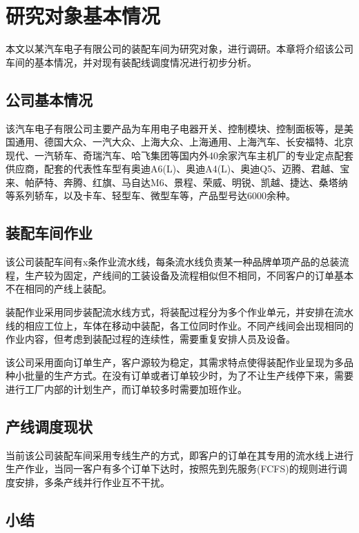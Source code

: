 \chapter{研究对象基本情况}
本文以某汽车电子有限公司的装配车间为研究对象，进行调研。本章将介绍该公司车间的基本情况，并对现有装配线调度情况进行初步分析。
\section{公司基本情况}
该汽车电子有限公司主要产品为车用电子电器开关、控制模块、控制面板等，是美国通用、德国大众、一汽大众、上海大众、上海通用、上海汽车、长安福特、北京现代、一汽轿车、奇瑞汽车、哈飞集团等国内外40余家汽车主机厂的专业定点配套供应商，配套的代表性车型有奥迪A6(L)、奥迪A4(L)、奥迪Q5、迈腾、君越、宝来、帕萨特、奔腾、红旗、马自达M6、景程、荣威、明锐、凯越、捷达、桑塔纳等系列轿车，以及卡车、轻型车、微型车等，产品型号达6000余种。

\section{装配车间作业}
该公司装配车间有x条作业流水线，每条流水线负责某一种品牌单项产品的总装流程，生产较为固定，产线间的工装设备及流程相似但不相同，不同客户的订单基本不在相同的产线上装配。

装配作业采用同步装配流水线方式，将装配过程分为多个作业单元，并安排在流水线的相应工位上，车体在移动中装配，各工位同时作业。不同产线间会出现相同的作业内容，但考虑到装配过程的连续性，需要重复安排人员及设备。

该公司采用面向订单生产，客户源较为稳定，其需求特点使得装配作业呈现为多品种小批量的生产方式。在没有订单或者订单较少时，为了不让生产线停下来，需要进行工厂内部的计划生产，而订单较多时需要加班作业。

\section{产线调度现状}
当前该公司装配车间采用专线生产的方式，即客户的订单在其专用的流水线上进行生产作业，当同一客户有多个订单下达时，按照先到先服务(FCFS)的规则进行调度安排，多条产线并行作业互不干扰。

\section{小结}